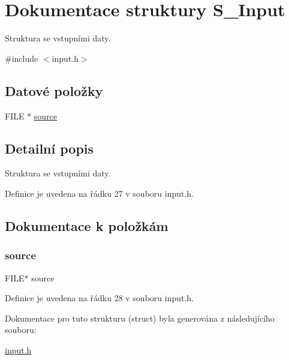 \hypertarget{struct_s___input}{}\section{Dokumentace struktury S\+\_\+\+Input}
\label{struct_s___input}


Struktura se vstupními daty.  




{\ttfamily \#include $<$input.\+h$>$}

\subsection*{Datové položky}
\begin{DoxyCompactItemize}
\item 
F\+I\+LE $\ast$ \hyperlink{struct_s___input_a0c4aa150664a3347db13aeeb47811829}{source}
\end{DoxyCompactItemize}


\subsection{Detailní popis}
Struktura se vstupními daty. 

Definice je uvedena na řádku 27 v souboru input.\+h.



\subsection{Dokumentace k položkám}
\mbox{\label{struct_s___input_a0c4aa150664a3347db13aeeb47811829}} 
\subsubsection{\texorpdfstring{source}{source}}
{\footnotesize\ttfamily F\+I\+LE$\ast$ source}



Definice je uvedena na řádku 28 v souboru input.\+h.



Dokumentace pro tuto strukturu (struct) byla generována z následujícího souboru\+:\begin{DoxyCompactItemize}
\item 
\hyperlink{input_8h}{input.\+h}\end{DoxyCompactItemize}
